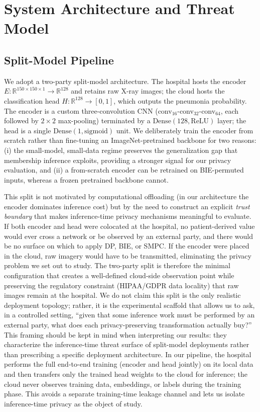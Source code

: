 \documentclass[conference]{IEEEtran}
\begin{document}
\section{System Architecture and Threat Model}
\label{sec:architecture}

\subsection{Split-Model Pipeline}
We adopt a two-party split-model architecture. The hospital hosts the encoder $E: \mathbb{R}^{150\times150\times 1}\!\to\!\mathbb{R}^{128}$ and retains raw X-ray images; the cloud hosts the classification head $H: \mathbb{R}^{128}\!\to\![0,1]$, which outputs the pneumonia probability. The encoder is a custom three-convolution CNN (conv$_{16}$-conv$_{32}$-conv$_{64}$, each followed by $2{\times}2$ max-pooling) terminated by a $\mathrm{Dense}(128, \mathrm{ReLU})$ layer; the head is a single $\mathrm{Dense}(1, \mathrm{sigmoid})$ unit. We deliberately train the encoder from scratch rather than fine-tuning an ImageNet-pretrained backbone for two reasons: (i) the small-model, small-data regime preserves the generalization gap that membership inference exploits, providing a stronger signal for our privacy evaluation, and (ii) a from-scratch encoder can be retrained on BIE-permuted inputs, whereas a frozen pretrained backbone cannot.

This split is not motivated by computational offloading (in our architecture the encoder dominates inference cost) but by the need to construct an explicit \emph{trust boundary} that makes inference-time privacy mechanisms meaningful to evaluate. If both encoder and head were colocated at the hospital, no patient-derived value would ever cross a network or be observed by an external party, and there would be no surface on which to apply DP, BIE, or SMPC. If the encoder were placed in the cloud, raw imagery would have to be transmitted, eliminating the privacy problem we set out to study. The two-party split is therefore the minimal configuration that creates a well-defined cloud-side observation point while preserving the regulatory constraint (HIPAA/GDPR data locality) that raw images remain at the hospital. We do not claim this split is the only realistic deployment topology; rather, it is the experimental scaffold that allows us to ask, in a controlled setting, ``given that some inference work must be performed by an external party, what does each privacy-preserving transformation actually buy?'' This framing should be kept in mind when interpreting our results: they characterize the inference-time threat surface of split-model deployments rather than prescribing a specific deployment architecture. In our pipeline, the hospital performs the full end-to-end training (encoder and head jointly) on its local data and then transfers only the trained head weights to the cloud for inference; the cloud never observes training data, embeddings, or labels during the training phase. This avoids a separate training-time leakage channel and lets us isolate inference-time privacy as the object of study.
\end{document}
